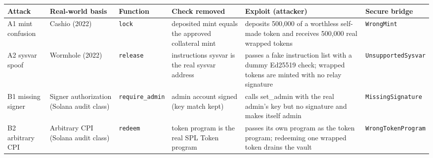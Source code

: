 \begin{tabular}{lp{2.4cm}lp{3cm}p{4.2cm}l}
\toprule
Attack & Real-world basis & Function & Check removed & Exploit (attacker) & Secure bridge \\
\midrule
A1 mint confusion & Cashio (2022) & \texttt{lock} & deposited mint equals the approved collateral mint & deposits 500,000 of a worthless self-made token and receives 500,000 real wrapped tokens & \texttt{WrongMint} \\
A2 sysvar spoof & Wormhole (2022) & \texttt{release} & instructions sysvar is the real sysvar address & passes a fake instruction list with a dummy Ed25519 check; wrapped tokens are minted with no relay signature & \texttt{UnsupportedSysvar} \\
B1 missing signer & Signer authorization (Solana audit class) & \texttt{require\_admin} & admin account signed (key match kept) & calls set\_admin with the real admin's key but no signature and makes itself admin & \texttt{MissingSignature} \\
B2 arbitrary CPI & Arbitrary CPI (Solana audit class) & \texttt{redeem} & token program is the real SPL Token program & passes its own program as the token program; redeeming one wrapped token drains the vault & \texttt{WrongTokenProgram} \\
\bottomrule
\end{tabular}
